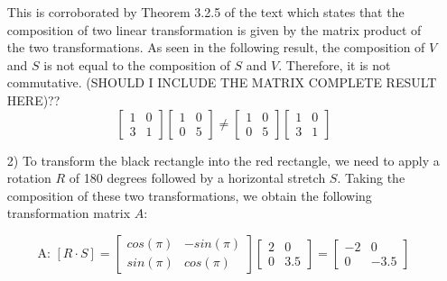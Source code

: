 \documentclass[10pt]{article}
\begin{document}
\begin{enumerate}[leftmargin=\labelsep]
    This is corroborated by Theorem 3.2.5 of the text which states that the composition of two linear transformation is given by the matrix product of the two transformations. As seen in the following result, the composition of $V$ and $S$ is not equal to the composition of $S$ and $V$. Therefore, 
    it is not commutative. (SHOULD I INCLUDE THE MATRIX COMPLETE RESULT HERE)??
    \begin{equation}
        \begin{bmatrix} 1 & 0 \\ 3 & 1 \end{bmatrix} \begin{bmatrix} 1 & 0 \\ 0 & 5 \end{bmatrix} \neq \begin{bmatrix} 1 & 0 \\ 0 & 5 \end{bmatrix} \begin{bmatrix} 1 & 0 \\ 3 & 1 \end{bmatrix}
    \end{equation}


    \item[2)] To transform the black rectangle into the red rectangle, we need to apply a rotation $R$ of 180 degrees followed by a 
    horizontal stretch $S$. Taking the composition of these two transformations, we obtain the following transformation matrix $A$:

    \[ \text{A: } [R \cdot S] = \begin{bmatrix}
        cos(\pi) & -sin(\pi) \\
        sin(\pi) & cos(\pi)
    \end{bmatrix} \begin{bmatrix}
        2 & 0 \\
        0 & 3.5
    \end{bmatrix} = 
    \begin{bmatrix}
        -2 & 0 \\
        0 & -3.5
    \end{bmatrix} \]

    
\end{enumerate}
\end{document}
